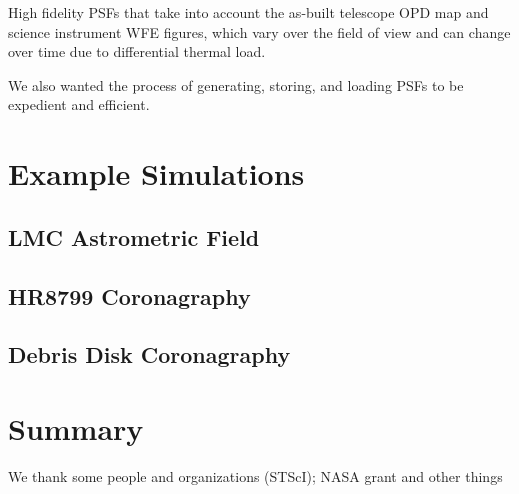 \documentclass[modern, linenumbers]{aastex62}
\begin{document}




High fidelity PSFs that take into account the as-built telescope OPD map and science instrument WFE figures, which vary over the field of view and can change over time due to differential thermal load.

We also wanted the process of generating, storing, and loading PSFs to be expedient and efficient.

\section{Example Simulations}

\subsection{LMC Astrometric Field}

\subsection{HR8799 Coronagraphy}

\subsection{Debris Disk Coronagraphy}


\section{Summary}

\acknowledgments

We thank some people and organizations (STScI); NASA grant and other things


\clearpage


% 


\end{document}
